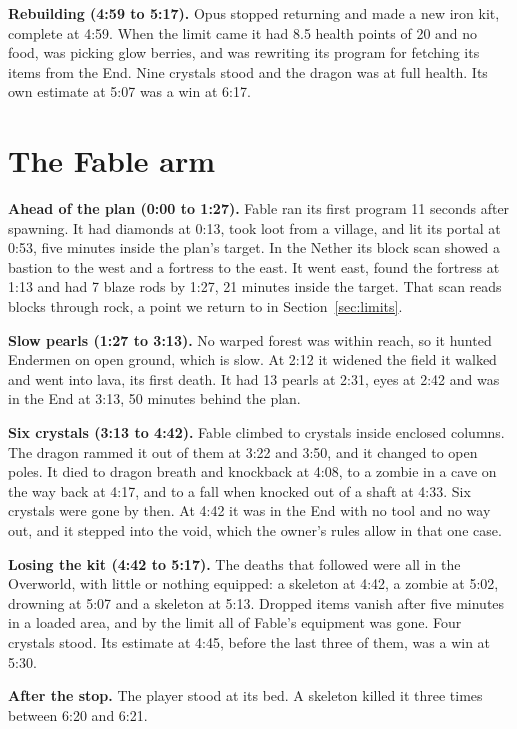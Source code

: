 \documentclass[11pt,a4paper]{article}
\begin{document}
\textbf{Rebuilding (4:59 to 5:17).} Opus stopped returning and made a new iron kit, complete at 4:59. When the limit came it had 8.5 health points of 20 and no food, was picking glow berries, and was rewriting its program for fetching its items from the End. Nine crystals stood and the dragon was at full health. Its own estimate at 5:07 was a win at 6:17.

\section{The Fable arm}
\label{sec:fable}

\textbf{Ahead of the plan (0:00 to 1:27).} Fable ran its first program 11 seconds after spawning. It had diamonds at 0:13, took loot from a village, and lit its portal at 0:53, five minutes inside the plan's target. In the Nether its block scan showed a bastion to the west and a fortress to the east. It went east, found the fortress at 1:13 and had 7 blaze rods by 1:27, 21 minutes inside the target. That scan reads blocks through rock, a point we return to in Section~\ref{sec:limits}.

\textbf{Slow pearls (1:27 to 3:13).} No warped forest was within reach, so it hunted Endermen on open ground, which is slow. At 2:12 it widened the field it walked and went into lava, its first death. It had 13 pearls at 2:31, eyes at 2:42 and was in the End at 3:13, 50 minutes behind the plan.

\textbf{Six crystals (3:13 to 4:42).} Fable climbed to crystals inside enclosed columns. The dragon rammed it out of them at 3:22 and 3:50, and it changed to open poles. It died to dragon breath and knockback at 4:08, to a zombie in a cave on the way back at 4:17, and to a fall when knocked out of a shaft at 4:33. Six crystals were gone by then. At 4:42 it was in the End with no tool and no way out, and it stepped into the void, which the owner's rules allow in that one case.

\textbf{Losing the kit (4:42 to 5:17).} The deaths that followed were all in the Overworld, with little or nothing equipped: a skeleton at 4:42, a zombie at 5:02, drowning at 5:07 and a skeleton at 5:13. Dropped items vanish after five minutes in a loaded area, and by the limit all of Fable's equipment was gone. Four crystals stood. Its estimate at 4:45, before the last three of them, was a win at 5:30.

\textbf{After the stop.} The player stood at its bed. A skeleton killed it three times between 6:20 and 6:21.
\end{document}
